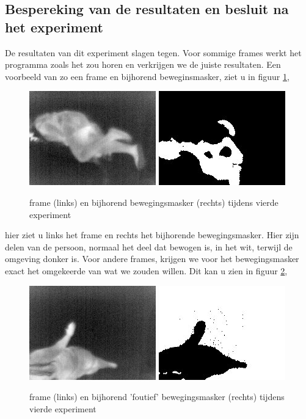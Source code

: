 \subsection{Bespereking van de resultaten en besluit na het experiment}
 \label{ERefRVB}
 De resultaten van dit experiment slagen tegen. Voor sommige frames werkt het programma zoals het zou horen en verkrijgen we de juiste resultaten. Een voorbeeld van zo een frame en bijhorend beweginsmasker, ziet u in figuur \ref{imgRVBJ},
  \begin{figure}[h]
  	\includegraphics[scale = 0.75]{VierdeExperiment_frameJuist}
  	\includegraphics[scale = 0.75]{VierdeExperiment_movMaskJuist}
  	\caption{frame (links) en bijhorend bewegingsmasker (rechts) tijdens vierde experiment}
  	\label{imgRVBJ}
  \end{figure}
  hier ziet u links het frame en rechts het bijhorende bewegingsmasker. Hier zijn delen van de persoon, normaal het deel dat bewogen is, in het wit, terwijl de omgeving donker is. Voor andere frames, krijgen we voor het bewegingsmasker exact het omgekeerde van wat we zouden willen. Dit kan u zien in figuur \ref{imgRVB}, 
 \begin{figure}[h]
 	\includegraphics[scale = 0.75]{VierdeExperiment_frame}
 	\includegraphics[scale = 0.75]{VierdeExperiment_movMask}
 	\caption{frame (links) en bijhorend 'foutief' bewegingsmasker (rechts) tijdens vierde experiment}
 	\label{imgRVB}
 \end{figure}
